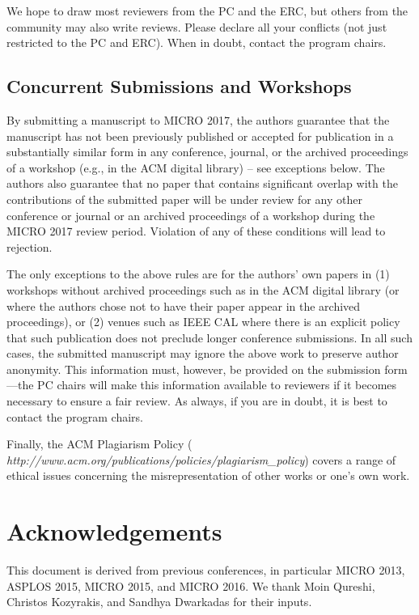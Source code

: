 \documentclass{sig-alternate}
\begin{document}
We hope to draw most reviewers from the PC and the ERC, but others from the
community may also write reviews.  Please declare all your conflicts (not
just restricted to the PC and ERC).  When in doubt, contact the program
chairs.


\subsection{Concurrent Submissions and Workshops}

By submitting a manuscript to MICRO 2017, the authors guarantee that the
manuscript has not been previously published or accepted for publication in
a substantially similar form in any conference, journal, or the archived
proceedings of a workshop (e.g., in the ACM digital library) -- see
exceptions below. The authors also guarantee that no paper that contains
significant overlap with the contributions of the submitted paper will be
under review for any other conference or journal or an archived proceedings
of a workshop during the MICRO 2017 review period. Violation of any of these
conditions will lead to rejection.

The only exceptions to the above rules are for the authors' own papers
in (1) workshops without archived proceedings such as in the ACM
digital library (or where the authors chose not to have their paper
appear in the archived proceedings), or (2) venues such as IEEE CAL
where there is an explicit policy that such publication does not
preclude longer conference submissions.  In all such cases, the
submitted manuscript may ignore the above work to preserve author
anonymity. This information must, however, be provided on the
submission form---the PC chairs will make this information available
to reviewers if it becomes necessary to ensure a fair review.  As
always, if you are in doubt, it is best to contact the program chairs.


Finally, the ACM Plagiarism Policy ({\em
http://www.acm.org/publications/policies/plagiarism\_policy}) covers a
range of ethical issues concerning the misrepresentation of other works or
one's own work.

\section{Acknowledgements}
This document is derived from previous conferences, in particular
MICRO 2013, ASPLOS 2015, MICRO 2015, and MICRO 2016.
We thank Moin Qureshi, Christos Kozyrakis, and Sandhya
Dwarkadas for their inputs.






\end{document}
